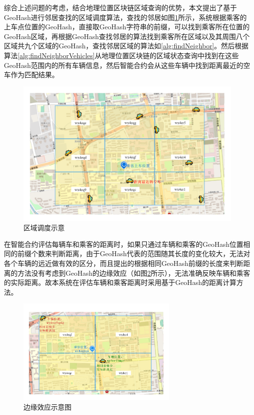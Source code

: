综合上述问题的考虑，结合地理位置区块链区域查询的优势，本文提出了基于GeoHash进行邻居查找的区域调度算法，查找的邻居如图\ref{fig:regionManage}所示，系统根据乘客的上车点位置的GeoHash，直接取GeoHash字符串的前缀，可以找到乘客所在位置的GeoHash区域，再根据GeoHash查找邻居的算法找到乘客所在区域以及其周围八个区域共九个区域的GeoHash，查找邻居区域的算法如\ref{alg:findNeighbor}。然后根据算法\ref{alg:findNeighborVehicles}从地理位置区块链的区域状态查询中找到在这些GeoHash范围内的所有车辆信息，然后智能合约会从这些车辆中找到距离最近的空车作为匹配结果。

\begin{figure}[h]
  \centering
  \includegraphics[width=1.0\textwidth]{figures/区域调度}
  \caption{区域调度示意}\label{fig:regionManage}
\end{figure}

在智能合约评估每辆车和乘客的距离时，如果只通过车辆和乘客的GeoHash位置相同的前缀个数来判断距离，由于GeoHash代表的范围随其长度的变化较大，无法对各个车辆的远近做有效的区分，而且提出的根据相同GeoHash前缀的长度来判断距离的方法没有考虑到GeoHash的边缘效应（如图\ref{fig:special}所示），无法准确反映车辆和乘客的实际距离。故本系统在评估车辆和乘客距离时采用基于GeoHash的距离计算方法。

\begin{figure}[h]
  \centering
  \includegraphics[width=0.7\textwidth]{figures/边缘效应}
  \caption{边缘效应示意图}\label{fig:special}
\end{figure}

